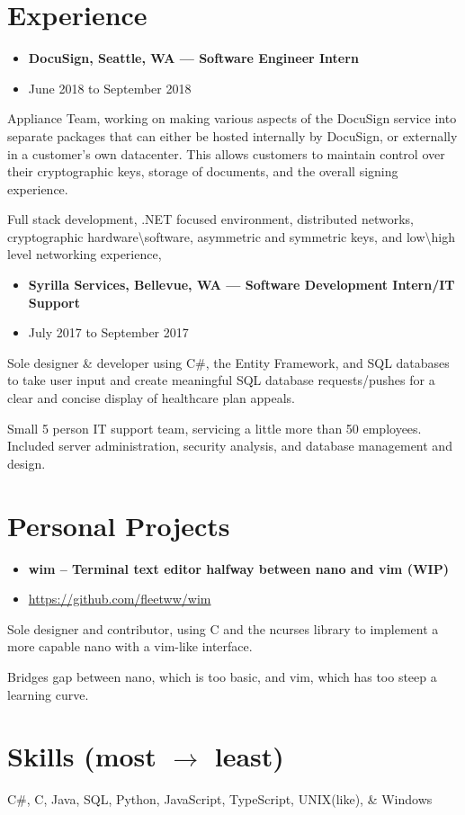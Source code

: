 \documentclass{article}
\newcommand{\ExpItem}[1]{\item #1}
\newcommand{\Workplace}[1]{#1}
\newcommand{\JobTitle}[1]{#1}
\newcommand{\Location}[1]{#1}
\newcommand{\StartDate}[1]{#1}
\newcommand{\EndDate}[1]{#1}
\newcommand{\Experience}[5]{
  \begin{itemize}[leftmargin=.125cm]
  		\item[] {\textbf{\large #1, #3 --- #2}} \item[] {\large #4 to #5}
  \end{itemize}
}
\newcommand{\startexpitems}{
\begin{itemize}[leftmargin=.6cm]
}
\newcommand{\closeexpitems}{
\end{itemize}
}
\newcommand{\ProjectTitle}[1]{#1}
\newcommand{\ProjectShortDesc}[1]{#1}
\newcommand{\ProjectLink}[1]{\url{#1}}
\newcommand{\Project}[3]{
	\begin{itemize}[leftmargin=.125cm]
		\item[] {\textbf{\large #1 -- #2}} \item[] #3
	\end{itemize}
}
\begin{document}
\section*{Experience}
\Experience
    {\Workplace{DocuSign}}
    {\JobTitle{Software Engineer Intern}}
    {\Location{Seattle, WA}}
    {\StartDate{June 2018}}
    {\EndDate{September 2018}}
\startexpitems
    {\ExpItem{Appliance Team, working on making various aspects of the DocuSign service into separate packages that can either be hosted internally by DocuSign, or externally in a customer's own datacenter. This allows customers to maintain control over their cryptographic keys, storage of documents, and the overall signing experience.}}
    {\ExpItem{Full stack development, .NET focused environment, distributed networks, cryptographic hardware\textbackslash software, asymmetric and symmetric keys, and low\textbackslash high level networking experience,}}
\closeexpitems
\Experience
	{\Workplace{Syrilla Services}}
	{\JobTitle{Software Development Intern/IT Support}}
	{\Location{Bellevue, WA}}
	{\StartDate{July 2017}}
	{\EndDate{September 2017}}
\startexpitems
	{\ExpItem{Sole designer \& developer using C\#, the Entity Framework, and SQL databases to take user input and create meaningful SQL database requests/pushes for a clear and concise display of healthcare plan appeals.}}
	{\ExpItem{Small 5 person IT support team, servicing a little more than 50 employees. Included server administration, security analysis, and database management and design.}}
\closeexpitems

\section*{Personal Projects}
\Project
	{\ProjectTitle{wim}}
	{\ProjectShortDesc{Terminal text editor halfway between nano and vim (WIP)}}
	{\ProjectLink{https://github.com/fleetww/wim}}
\startexpitems
	{\ExpItem{Sole designer and contributor, using C and the ncurses library to implement a more capable nano with a vim-like interface.}}
	{\ExpItem{Bridges gap between nano, which is too basic, and vim, which has too steep a learning curve.}}
\closeexpitems

\section*{Skills (most $\rightarrow$ least)}
C\#, C, Java, SQL, Python, JavaScript, TypeScript, UNIX(like), \& Windows
\end{document}
